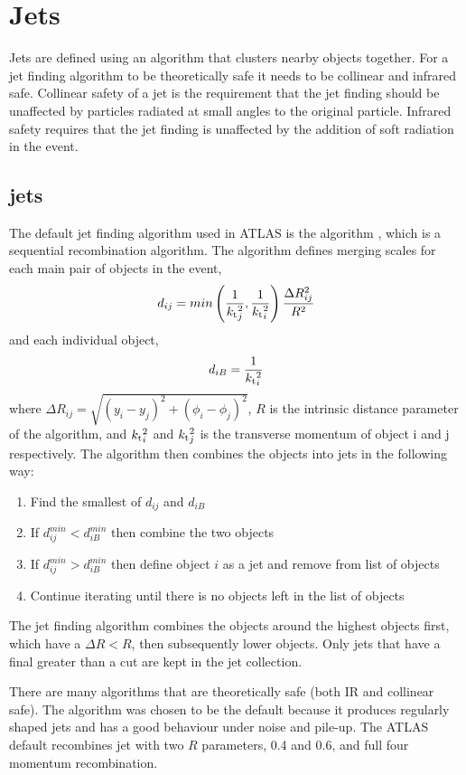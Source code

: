 \section{Jets}
\label{sec:Theory:Jets}

Jets are defined using an algorithm that clusters nearby objects together.
For a jet finding algorithm to be theoretically safe it needs to be collinear and infrared safe. 
Collinear safety of a jet is the requirement that the jet finding should be unaffected by particles radiated at small angles to the original particle. 
Infrared safety requires that the jet finding is unaffected by the addition of soft radiation in the event.  


\subsection{\Antikt{} jets}

The default jet finding algorithm used in ATLAS is the \antikt{} algorithm \cite{ref:antiKt}, which is a sequential recombination algorithm.
The algorithm defines merging scales for each  main pair of objects in the event, 
\begin{equation}
d_{ij} = min\left( \frac{1}{\mbox{$k_{\rm t}$}{}_j^2},\frac{1}{\mbox{$k_{\rm t}$}{}_i^2}\right) \frac{\Delta R_{ij}^2}{R^2}
\label{Theory:dij}
\end{equation}
and each individual object, 
\begin{equation}
d_{iB} = \frac{1}{\mbox{$k_{\rm t}$}{}_i^2}
\label{Theory:diB}
\end{equation}
where $\Delta R_{ij}=\sqrt{(y_{i} - y_{j})^2+(\phi_{i} - \phi_{j})^2}$, $R$ is the intrinsic distance parameter of the algorithm, and $\mbox{$k_{\rm t}$}{}_i^2$ and $\mbox{$k_{\rm t}$}{}_j^2$ is the transverse momentum of object i and j respectively. 
The algorithm then combines the objects into jets in the following way:
\begin{enumerate}
\item Find the smallest of $d_{ij}$ and $d_{iB}$
\item If $d_{ij}^{min} < d_{iB}^{min}$ then combine the two objects
\item If $d_{ij}^{min} > d_{iB}^{min}$ then define object $i$ as a jet and remove from list of objects
\item Continue iterating until there is no objects left in the list of objects 
\end{enumerate}
The \antikt{} jet finding algorithm combines the objects around the highest \pt{} objects first, which have a  $\Delta R  < R$, then subsequently lower \pt{} objects.
Only jets that have a final \pt{} greater than a \pt{} cut are kept in the jet collection. 

There are many algorithms that are theoretically safe (both IR and collinear safe).
The \antikt{} algorithm was chosen to be the default because it produces regularly shaped jets and has a good behaviour under noise and pile-up. 
The ATLAS default recombines jet with two $R$ parameters, 0.4 and 0.6, and full four momentum recombination.
